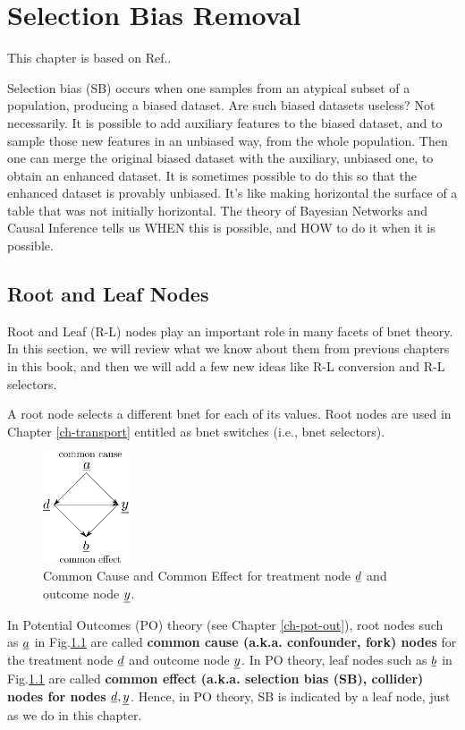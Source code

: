 \chapter{Selection Bias Removal}
\label{ch-sb-removal}
This chapter
is based on Ref.\cite{bare-sb-removal}.

Selection bias (SB)
occurs when one
samples from an
atypical subset
of a
population,
producing a biased dataset.
Are such biased
datasets
useless? Not necessarily.
It is possible to
add auxiliary features
to the biased dataset, and to
sample those new features
in an unbiased way,
 from the whole population.
Then
one can merge
the original
 biased dataset with the
auxiliary, unbiased one,
to obtain an enhanced dataset.
It is sometimes
possible to do this so that the enhanced
dataset is provably
unbiased.
It's like making horizontal
the surface of a table
 that was
 not initially
horizontal.
The theory of Bayesian Networks and Causal
Inference tells us
WHEN this is possible,
and HOW to do it
when it is possible.


\section{Root and Leaf Nodes}

Root and Leaf (R-L) nodes play an important role in many facets of
bnet theory. In this section, we will review what we know
about them from previous chapters in this book, and then we will add a few new
ideas like R-L conversion and R-L selectors.

A root node selects a different bnet 
for each of its values.
Root nodes are used
in Chapter \ref{ch-transport}
entitled 
as bnet switches (i.e., bnet selectors).




\begin{figure}[h!]
\centering
\includegraphics[width=1in]
{sb-removal/common-cause-effect.png}
\caption{Common Cause
and Common Effect for
treatment node $\rvd$
and outcome node $\rvy$.}
\label{fig-common-cause-effect}
\end{figure}

In Potential
Outcomes (PO) theory
 (see Chapter \ref{ch-pot-out}),
root nodes such
as $\rva$ in
Fig.\ref{fig-common-cause-effect}
are called {\bf common cause
 (a.k.a. confounder, fork) nodes}
for the treatment node $\rvd$
and outcome node $\rvy$.
In PO theory, leaf nodes such as
$\rvb$ in
Fig.\ref{fig-common-cause-effect} are
called
{\bf common effect
(a.k.a. selection bias (SB), collider) nodes
for nodes $\rvd, \rvy$}.
Hence, in PO theory,
SB is indicated
by
a leaf node,
just as we do in this chapter.

